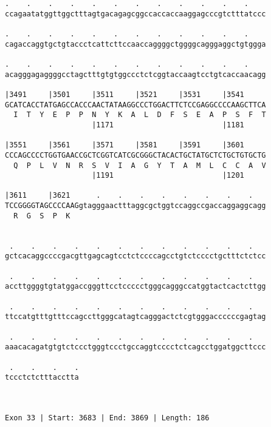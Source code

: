 \documentclass{article}
\begin{document}
\begin{Verbatim}
.    .    .    .    .    .    .    .    .    .    .    .    
ccagaatatggttggctttagtgacagagcggccaccaccaaggagcccgtctttatccc
                                                            
.    .    .    .    .    .    .    .    .    .    .    .    
cagaccaggtgctgtaccctcattcttccaaccaggggctggggcagggaggctgtggga
                                                            
.    .    .    .    .    .    .    .    .    .    .    .    
acagggagaggggcctagctttgtgtggccctctcggtaccaagtcctgtcaccaacagg
                                                            
|3491     |3501     |3511     |3521     |3531     |3541     
GCATCACCTATGAGCCACCCAACTATAAGGCCCTGGACTTCTCCGAGGCCCCAAGCTTCA
  I  T  Y  E  P  P  N  Y  K  A  L  D  F  S  E  A  P  S  F  T
                    |1171                         |1181     
  
|3551     |3561     |3571     |3581     |3591     |3601     
CCCAGCCCCTGGTGAACCGCTCGGTCATCGCGGGCTACACTGCTATGCTCTGCTGTGCTG
  Q  P  L  V  N  R  S  V  I  A  G  Y  T  A  M  L  C  C  A  V
                    |1191                         |1201     
  
|3611     |3621      .    .    .    .    .    .    .    .   
TCCGGGGTAGCCCCAAGgtagggaactttaggcgctggtccaggccgaccaggaggcagg
  R  G  S  P  K                                             
                                                            
  
 .    .    .    .    .    .    .    .    .    .    .    .   
gctcacaggccccgacgttgagcagtcctctccccagcctgtctcccctgctttctctcc
                                                            
 .    .    .    .    .    .    .    .    .    .    .    .   
accttggggtgtatggaccgggttcctccccctgggcagggccatggtactcactcttgg
                                                            
 .    .    .    .    .    .    .    .    .    .    .    .   
ttccatgtttgtttccagccttgggcatagtcagggactctcgtgggaccccccgagtag
                                                            
 .    .    .    .    .    .    .    .    .    .    .    .   
aaacacagatgtgtctccctgggtccctgccaggtcccctctcagcctggatggcttccc
                                                            
 .    .    .    .
tccctctctttacctta
                 
                 
 
Exon 33 | Start: 3683 | End: 3869 | Length: 186




\end{Verbatim}
\end{document}
